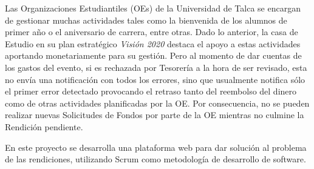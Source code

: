 \begin{resumen}

    
    Las Organizaciones Estudiantiles (OEs) de la Universidad de Talca se encargan de gestionar muchas actividades tales como la bienvenida de los alumnos de primer año o el aniversario de carrera, entre otras. Dado lo anterior, la casa de Estudio en su plan estratégico \emph{Visión 2020} destaca el apoyo a estas actividades aportando monetariamente para su gestión. Pero al momento de dar cuentas de los gastos del evento, si es rechazada por Tesorería a la hora de ser revisado, esta no envía una notificación con todos los errores, sino que usualmente notifica sólo el primer error detectado provocando el retraso tanto del reembolso del dinero como de otras actividades planificadas por la OE. Por consecuencia, no se pueden realizar nuevas Solicitudes de Fondos por parte de la OE mientras no culmine la Rendición pendiente.


    

    
    En este proyecto se desarrolla una plataforma web para dar solución al problema de las rendiciones, utilizando Scrum como metodología de desarrollo de software.


\end{resumen}

